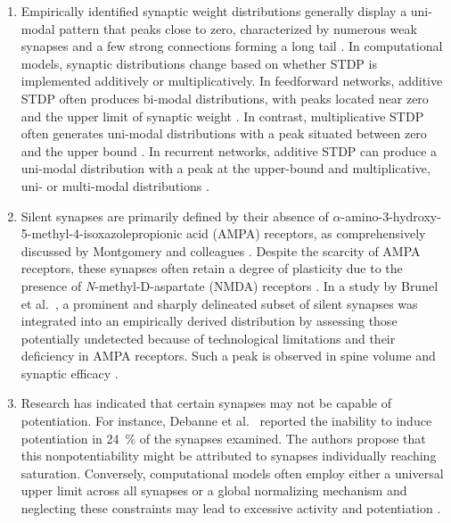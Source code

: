 \documentclass[utf8]{FrontiersinHarvard} %
\begin{document}
\begin{enumerate}
    \item Empirically identified synaptic weight distributions generally display a uni-modal pattern that peaks close to zero, characterized by numerous weak synapses and a few strong connections forming a long tail \citep{Buzsaki.2004n8e,Yasumatsu.2008g4n,KASAI.20239m}. In computational models, synaptic distributions change based on whether STDP is implemented additively or multiplicatively. In feedforward networks, additive STDP often produces bi-modal distributions, with peaks located near zero and the upper limit of synaptic weight \citep{Rossum.2000jye,Barbour.2007,Morrison.2008}. In contrast, multiplicative STDP often generates uni-modal distributions with a peak situated between zero and the upper bound \citep{Rossum.2000jye,Barbour.2007,Morrison.2008}. In recurrent networks, additive STDP can produce a uni-modal distribution with a peak at the upper-bound and multiplicative, uni- or multi-modal distributions \citep{Morrison.2007}.

    \item Silent synapses are primarily defined by their absence of $\alpha$-amino-3-hydroxy-5-methyl-4-isoxazolepropionic acid (AMPA) receptors, as comprehensively discussed by Montgomery and colleagues \citeyearpar{Montgomery.2004}. Despite the scarcity of AMPA receptors, these synapses often retain a degree of plasticity due to the presence of \textit{N}-methyl-D-aspartate (NMDA) receptors \citep{Kim.2025}. In a study by Brunel et al.~\citeyearpar{Brunel.2004}, a prominent and sharply delineated subset of silent synapses was integrated into an empirically derived distribution by assessing those potentially undetected because of technological limitations and their deficiency in AMPA receptors. Such a peak is observed in spine volume \citep{Yasumatsu.2008g4n} and synaptic efficacy \citep{Barbour.2007}.

    \item Research has indicated that certain synapses may not be capable of potentiation. For instance, Debanne et al.~\citeyearpar{Debanne.1999} reported the inability to induce potentiation in \SI{24}{\percent} of the synapses examined. The authors propose that this nonpotentiability might be attributed to synapses individually reaching saturation. Conversely, computational models often employ either a universal upper limit across all synapses or a global normalizing mechanism and neglecting these constraints may lead to excessive activity and potentiation \citep{Rossum.2000jye}.


\end{enumerate}
\end{document}
